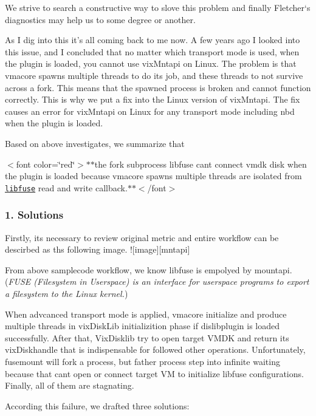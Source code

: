We strive to search a constructive way to slove this problem and finally Fletcher‘s diagnostics may help us to some degree or another. \begin{DoxyVerb}As I dig into this it's all coming back to me now.  A few years ago I looked into this issue, and I concluded that no matter which transport mode is used, when the plugin is loaded, you cannot use vixMntapi on Linux.  The problem is that vmacore spawns multiple threads to do its job, and these threads to not survive across a fork.  This means that the spawned process is broken and cannot function correctly.  This is why we put a fix into the Linux version of vixMntapi.  The fix causes an error for vixMntapi on Linux for any transport mode including nbd when the plugin is loaded.
\end{DoxyVerb}


Based on above investigates, we summarize that

$<$font color=\char`\"{}red\char`\"{}$>$$\ast$$\ast$the fork subprocess libfuse can\textquotesingle{}t connect vmdk disk when the plugin is loaded because vmacore spawns multiple threads are isolated from \href{https://github.com/libfuse/libfuse}{\tt libfuse} read and write callback.$\ast$$\ast$$<$/font$>$ 

 \subsubsection*{1. Solutions}

Firstly, it\textquotesingle{}s necessary to review original metric and entire workflow can be descirbed as ths following image. !\mbox{[}image\mbox{]}\mbox{[}mntapi\mbox{]}

From above samplecode workflow, we know libfuse is empolyed by mountapi. ({\itshape F\+U\+SE (Filesystem in Userspace) is an interface for userspace programs to export a filesystem to the Linux kernel.})

When advcanced transport mode is applied, vmacore initialize and produce multiple threads in vix\+Disk\+Lib initializition phase if dislibplugin is loaded successfully. After that, Vix\+Disklib try to open target V\+M\+DK and return its vix\+Diskhandle that is indispensable for followed other operations. Unfortunately, fusemount will fork a process, but father process step into infinite waiting because that can\textquotesingle{}t open or connect target VM to initialize libfuse configurations. Finally, all of them are stagnating.

According this failure, we drafted three solutions\+:


